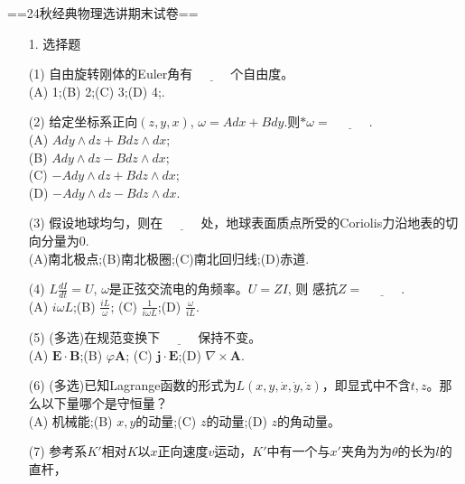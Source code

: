 ==24秋\quad 经典物理选讲\quad 期末试卷==
\def\r{\boldsymbol{r}}
\def\v{\boldsymbol{v}}
\def\a{\boldsymbol{a}}
\def\p{\boldsymbol{p}}
\def\T{\boldsymbol{T}}
\def\N{\boldsymbol{N}}
\def\J{\boldsymbol{J}}
\def\q{\boldsymbol{q}}
\def\n{\boldsymbol{n}}
\def\f{\boldsymbol{f}}
\def\E{\boldsymbol{E}}
\def\B{\boldsymbol{B}}
\def\A{\boldsymbol{A}}
\def\j{\boldsymbol{j}}
\begin{itemize}
    \item[1.]选择题
    \item[(1)]自由旋转刚体的Euler角有$\underline{\qquad\quad}$个自由度。\\
    (A) 1;\quad (B) 2;\quad (C) 3;\quad (D) 4;\quad.
    \item[(2)]给定坐标系正向$(z,y,x)$, $\omega=Adx+Bdy.$则$*\omega=\underline{\qquad\quad}$.\\
    (A) $Ady\wedge dz+Bdz\wedge dx$;\\
    (B) $Ady\wedge dz-Bdz\wedge dx$;\\
    (C) $-Ady\wedge dz+Bdz\wedge dx$;\\
    (D) $-Ady\wedge dz-Bdz\wedge dx$.\\
    \item[(3)]假设地球均匀，则在$\underline{\qquad\quad}$处，地球表面质点所受的Coriolis力沿地表的切向分量为$0$.\\
    (A)南北极点;\quad (B)南北极圈;\quad (C)南北回归线;\quad (D)赤道.
    \item[(4)]$L\frac{dI}{dt}=U$, $\omega$是正弦交流电的角频率。$U=ZI$, 则
    感抗$Z=\underline{\qquad\quad}$.\\
    (A) $i\omega L$;\quad (B) $\frac{iL}{\omega}$;\quad 
    (C) $\frac{1}{i\omega L}$;\quad (D) $\frac{\omega}{iL}$.
    \item[(5)](多选)在规范变换下$\underline{\qquad\quad}$保持不变。\\
    (A) $\E\cdot\B$;\quad (B) $\varphi\A$;\quad 
    (C) $\j\cdot\E$;\quad (D) $\nabla\times\A$.
    \item[(6)](多选)已知Lagrange函数的形式为$L(x,y,\dot{x},\dot{y},\dot{z})$，即显式中不含$t,z$。那么以下量哪个是守恒量？\\
    (A) 机械能;\quad (B) $x,y$的动量;\quad (C) $z$的动量;\quad (D) $z$的角动量。
    \item[(7)]参考系$K'$相对$K$以$x$正向速度$v$运动，$K'$中有一个与$x'$夹角为为$\theta$的长为$l$的直杆，

\end{itemize}
